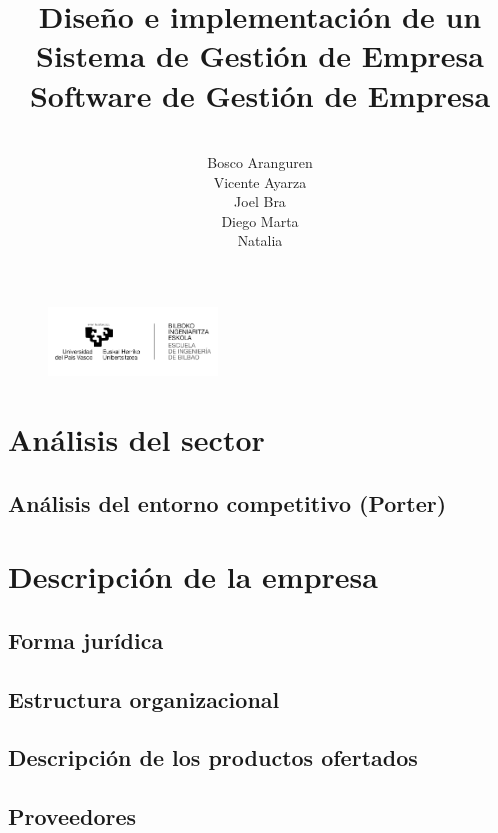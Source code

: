 \documentclass[12pt, letterpaper]{article}
\title{\textsf{\textbf{\Huge Diseño e implementación de un Sistema de Gestión de Empresa}\\ \large \textbf{Software de Gestión de Empresa}}}
\author{\vspace{70px} \\\textsf{Bosco Aranguren} \\ \textsf{Vicente Ayarza} \\ \textsf{Joel Bra} \\ \textsf{Diego Marta} \\ \textsf{Natalia }}
\date{\textsf{\vspace{30px} }}
\begin{document}
\maketitle
{}

\begin{figure}[b]
\centering
\includegraphics[width=170px]{logo.png}
\end{figure}

\sffamily
\thispagestyle{empty}
\clearpage
\tableofcontents
\clearpage
\section{\textsf{Análisis del sector}}

\subsection{\textsf{Análisis del entorno competitivo (Porter)}}

\pagebreak
\section{\textsf{Descripción de la empresa}}
\subsection{\textsf{Forma jurídica}}

\subsection{\textsf{Estructura organizacional}}

\subsection{\textsf{Descripción de los productos ofertados}}

\subsection{\textsf{Proveedores}}

\pagebreak
\end{document}

